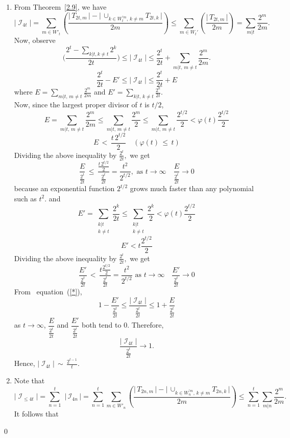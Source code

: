 \documentclass[a4paper,12pt]{amsart}
\renewenvironment{proof}{{\bfseries Proof.}}{\qed}
\numberwithin{equation}{section}
\theoremstyle{definition}
\newcommand{\thmref}[1]{Theorem~\ref{#1}}
\newcommand{\eqnref}[1]{~{equation~(\ref{#1})}}
\numberwithin{equation}{section}
\begin{document}
\begin{proof}
\begin{enumerate}
\item  From \thmref{2.9}, we have
   $$\lvert \;\mathscr{I}_{4t}\;\rvert = \sum_{m \in W'_t} \left ( \frac{\lvert\, T_{2t,m} \,\rvert- \lvert \,\cup_{k\in W_t^{'m},\, k\neq m}T_{2t,k}\,\rvert}{2m}\right)\leq\sum_{m \in W_t'} \left ( \frac{\lvert \,T_{2t,m}\, \rvert}{2m}\right)=\sum_{m|t}\frac{2^m}{2m}.$$ 
   Now, observe
   $$\bigg(\frac{2^t-\sum_{k \lvert t, k \neq t}2^k}{2t}\bigg)\leq\lvert \;\mathscr{I}_{4t}\;\rvert \leq \frac{2^t}{2t}+\sum_{m|t,\, m \neq t}\frac{2^m}{2m}.$$
   \begin{equation}\label{*} 
       \frac{2^t}{2t}-E' \leq \lvert \;\mathscr{I}_{4t}\;\rvert \leq \frac{2^t}{2t}+E
        \end{equation}
   where  $ E= \sum_{m|t,\, m \neq t}\frac{2^m}{2m} $ and $E'=\sum_{k|t,\, k \neq t}\frac{2^k}{2t}$. \\Now, since the largest proper divisor of $t$ is $t/2$,
   $$ E= \sum_{m|t,\, m \neq t}\frac{2^m}{2m} \leq \sum_{m|t,\, m \neq t}\frac{2^m}{2} \leq \sum_{m|t,\, m \neq t}\frac{2^{t/2}}{2}< \varphi(t)\frac{2^{t/2}}{2}$$  
   $$E\,<\,\frac{t\,2^{t/2}}{2} \quad ( \varphi(t)\,\leq\, t)$$
   Dividing the above inequality by $\frac{2^t}{2t},$ we get
   $$\frac{E}{\frac{2^t}{2t}}\,\leq \,\frac{\frac{t\,2^{t/2}}{2}}{\frac{2^t}{2t}} = \frac{t^2}{2^{t/2}}, \text{ as } t \to \infty \quad  \frac{E}{\frac{2^t}{2t}}\to 0$$ because an exponential function $2^{t/2}$ grows much faster than any polynomial such as $t^2.$
   and 
   $$ E'=\sum_{\substack{k \lvert t \\ k \neq t}} \frac{2^k}{2t}  \leq \sum_{\substack{k \lvert t \\ k \neq t}}\frac{2^k}{2} <\varphi(t)\frac{2^{t/2}}{2}$$
   $$E'<t\frac{2^{t/2}}{2}$$
   Dividing the above inequality by $\frac{2^t}{2t},$ we get
   $$ \frac{E'}{\frac{2^t}{2t}}\,< \,\frac{t\frac{2^{t/2}}{2}}{\frac{2^t}{2t}}=\frac{t^2}{2^{t/2}}\text{ as } t \to \infty \quad  \frac{E'}{\frac{2^t}{2t}}\to 0$$
   From \eqnref{*}, 
$$1-\frac{E'}{\frac{2^t}{2t}}\leq\frac{\lvert \;\mathscr{I}_{4t}\;\rvert}{\frac{2^t}{2t}} \leq 1+\frac{E}{\frac{2^t}{2t}}$$
as $t \to \infty$, $\dfrac{E}{\frac{2^t}{2t}}$ and $\dfrac{E'}{\frac{2^t}{2t}}$ both tend to $0$. Therefore,
$$\frac{\lvert \;\mathscr{I}_{4t}\;\rvert}{\frac{2^t}{2t}} \to 1.$$
Hence, $\lvert \;\mathscr{I}_{4t}\;\rvert\, \sim\, \frac{2^{t-1}}{t}.$ 
\item  Note that $$\lvert \;\mathscr{I}_{\leq4t}\;\rvert = \sum_{n=1}^{t}\,\,\lvert\,\mathscr{I}_{4n}\,\rvert=\sum_{n=1}^{t}\sum_{m \in W'_n} \left ( \frac{\lvert\, T_{2n,m} \,\rvert- \lvert\, \cup_{k\in W_n^{'m},\, k\neq m}T_{2n,k}\,\rvert}{2m}\right)\leq\sum_{n=1}^{t}\sum_{m \lvert n}\frac{2^m}{2m}.$$ It follows that

\end{enumerate}
\end{proof}
\end{document}
